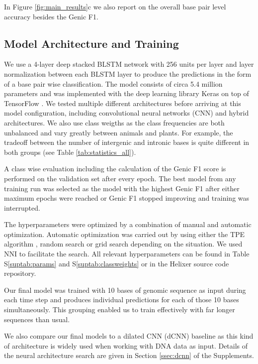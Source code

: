 \documentclass{bioinfo}
\newcounter{suptab}
\begin{document}
\begin{methods}
In Figure \ref{fig:main_results}c we also report on the overall base pair level 
accuracy besides the Genic F1.

\subsection{Model Architecture and Training}
\label{sec:model}
We use a 4-layer deep stacked BLSTM network with 256 units per layer and layer 
normalization \citep{ba2016layer} between each BLSTM layer to produce the 
predictions in the form of a base pair wise classification. The model consists of 
circa 5.4 million parameters and was implemented with the deep learning library 
Keras \citep{chollet2015keras} on top of TensorFlow \citep{abadi2016tensorflow}. We 
tested multiple different architectures before arriving at this model configuration, 
including convolutional neural networks (CNN) and hybrid architectures. We also use 
class weigths as the class frequencies are both unbalanced and 
vary greatly between animals and plants. 
For example, the tradeoff between the number of intergenic and intronic bases is 
quite different in both groups (see Table \ref{tab:statistics_all}). 

A class wise evaluation including the calculation of the Genic 
F1 score is performed on the validation set after every epoch. The best model
from any training run was selected as the model with the highest Genic F1 after either
maximum epochs were reached or Genic F1 stopped improving and training was interrupted.

The hyperparameters were optimized by a combination of manual and automatic 
optimization. Automatic optimization was carried out by using either the TPE 
algorithm \citep{bergstra2011algorithms}, random search or grid search depending on 
the situation. We used NNI \citep{nni2019} to facilitate the search. All relevant 
hyperparameters can be found in Table S\ref{suptab:params} and 
S\ref{suptab:classweights} or in the Helixer source code repository. 
	
Our final model was trained with 10 bases of genomic sequence as input during each 
time step and produces individual predictions for each of those 10 bases 
simultaneously. This grouping enabled us to train effectively with far longer 
sequences than usual. 

We also compare our final models to a dilated CNN (dCNN) baseline as this kind of architecture is 
widely used when working with DNA data as input. Details of the neural architecture 
search are given in Section \ref{ssec:dcnn} of the Supplements.


\end{methods}
\end{document}
